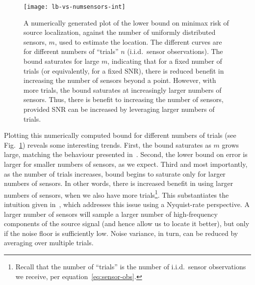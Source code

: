 \documentclass[conference]{IEEEtran}
\begin{document}
\begin{figure}[t]
	\centering
	\texttt{[image: lb-vs-numsensors-int]}
	\caption{A numerically generated plot of the lower bound on minimax risk of
		source localization, against the number of uniformly distributed
		sensors, $m$, used to estimate the location. The different curves are
		for different numbers of ``trials'' $n$ (i.i.d.\ sensor observations).
		The bound saturates for large $m$, indicating that for a fixed number
		of trials (or equivalently, for a fixed SNR), there is reduced benefit
		in increasing the number of sensors beyond a point. However, with more
		trials, the bound saturates at increasingly larger numbers of sensors.
	Thus, there is benefit to increasing the number of sensors, provided SNR
can be increased by leveraging larger numbers of trials.}
	\label{fig:numerical}
\end{figure}

Plotting this numerically computed bound for different numbers of trials (see
Fig.~\ref{fig:numerical}) reveals some interesting trends. First, the bound
saturates as $m$ grows large, matching the behaviour presented
in~\cite{Grover2016Fundamental}. Second, the lower bound on error is larger for
smaller numbers of sensors, as we expect. Third and most importantly, as the
number of trials increases, bound begins to saturate only for larger numbers of
sensors. In other words, there is increased benefit in using larger numbers of
sensors, when we also have more trials\footnote{Recall that the number of
``trials'' is the number of i.i.d.\ sensor observations we receive, per
equation~\ref{eq:sensor-obs}.}. This substantiates the intuition given
in~\cite{Grover2016Information}, which addresses this issue using a
Nyquist-rate perspective. A larger number of sensors will sample a larger
number of high-frequency components of the source signal (and hence allow us to
locate it better), but only if the noise floor is sufficiently low. Noise
variance, in turn, can be reduced by averaging over multiple trials.


\end{document}
